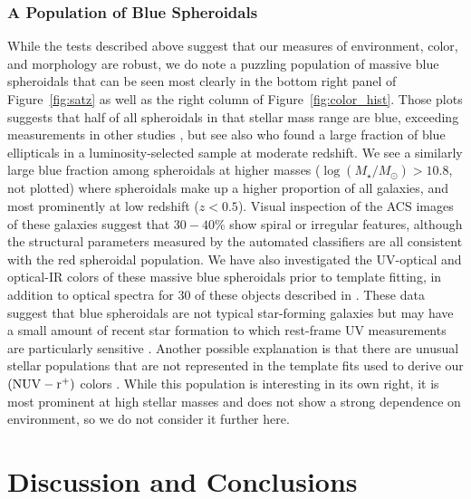 \documentclass[12pt]{emulateapj}
\newcommand{\nuvr}{{$(\rm{NUV} - r^+)$ }}
\begin{document}
\subsubsection{A Population of Blue Spheroidals}

While the tests described above suggest that our measures of
environment, color, and morphology are robust, we do note a puzzling
population of massive blue spheroidals that can be seen most clearly
in the bottom right panel of Figure~\ref{fig:satz} as well as the
right column of Figure~\ref{fig:color_hist}. Those plots suggests
that half of all spheroidals in that stellar mass range are blue,
exceeding measurements in other studies \citep[e.g.][]{Kaviraj2007,
  Kaviraj2008, Bamford2009, Schawinksi2009, Ilbert2010}, but see also
\citet{Cross2004} who found a large fraction of blue ellipticals in a
luminosity-selected sample at moderate redshift. We see a similarly
large blue fraction among spheroidals at higher masses
($\log(M_{\star}/M_{\odot}) > 10.8$, not plotted) where spheroidals make up a
higher proportion of all galaxies, and most prominently at low
redshift ($z<0.5$). Visual inspection of the ACS images of these
galaxies suggest that $30-40\%$ show spiral or irregular features,
although the structural parameters measured by the automated
classifiers are all consistent with the red spheroidal population. We
have also investigated the UV-optical and optical-IR colors of these
massive blue spheroidals prior to template fitting, in addition to
optical spectra for $30$ of these objects described in
\citet{George2011}. These data suggest that blue spheroidals are not
typical star-forming galaxies but may have a small amount of recent
star formation to which rest-frame UV measurements are particularly
sensitive \citep[e.g.][]{Kaviraj2007, Kaviraj2008}. Another possible
explanation is that there are unusual stellar populations that are not
represented in the template fits used to derive our \nuvr colors
\citep[see e.g.][for a discussion of galaxy properties contributing to
the ``UV upturn'']{Smith2012}. While this population is interesting in
its own right, it is most prominent at high stellar masses and does
not show a strong dependence on environment, so we do not consider it
further here.

\section{Discussion and Conclusions}
\label{s:discussion}
\end{document}
